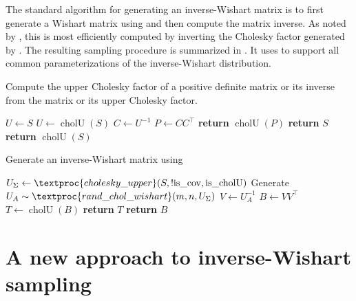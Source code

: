 \documentclass[12pt,a4paper,reqno]{amsart}
\numberwithin{equation}{section}
\newcommand{\cholU}{\operatorname{cholU}}
\begin{document}
The standard algorithm for generating an inverse-Wishart matrix is to first generate a Wishart matrix using  and then compute the matrix inverse.
As noted by \cite{jones_generating_1985}, this is most efficiently computed by inverting the Cholesky factor generated by .
The resulting sampling procedure is summarized in .
It uses  to support all common parameterizations of the inverse-Wishart distribution.

\begin{algorithm}
    \caption{Compute the upper Cholesky factor of a positive definite matrix or its inverse from the matrix or its upper Cholesky factor.}\label{cholupper}
    \begin{algorithmic}[1]
        \State $U \gets S$
        \Else
        \State $U \gets \cholU(S)$
        \EndIf
        \State $C \gets U^{-1}$
        \State $P \gets C C^\top$
        \State \textbf{return} $\cholU(P)$
        \Else
        \State \textbf{return} $S$
        \Else
        \State \textbf{return} $\cholU(S)$
        \EndIf
        \EndIf
        \EndFunction
    \end{algorithmic}
\end{algorithm}

\begin{algorithm}
    \caption{Generate an inverse-Wishart matrix using }\label{invwishartfromwishart}
    \begin{algorithmic}[1]
        \State $U_\Sigma \gets \textproc{cholesky\_upper}(S, !\mathrm{is\_cov}, \mathrm{is\_cholU})$
        \State Generate $U_A \sim \textproc{rand\_chol\_wishart}(m,n,U_\Sigma)$
        \State $V \gets U_A^{-1}$
        \State $B \gets V V^{\top}$
        \State $T \gets \cholU(B)$
        \State \textbf{return} $T$
        \Else
        \State \textbf{return} $B$
        \EndIf
        \EndFunction
    \end{algorithmic}
\end{algorithm}

\section{A new approach to inverse-Wishart sampling}
\end{document}
